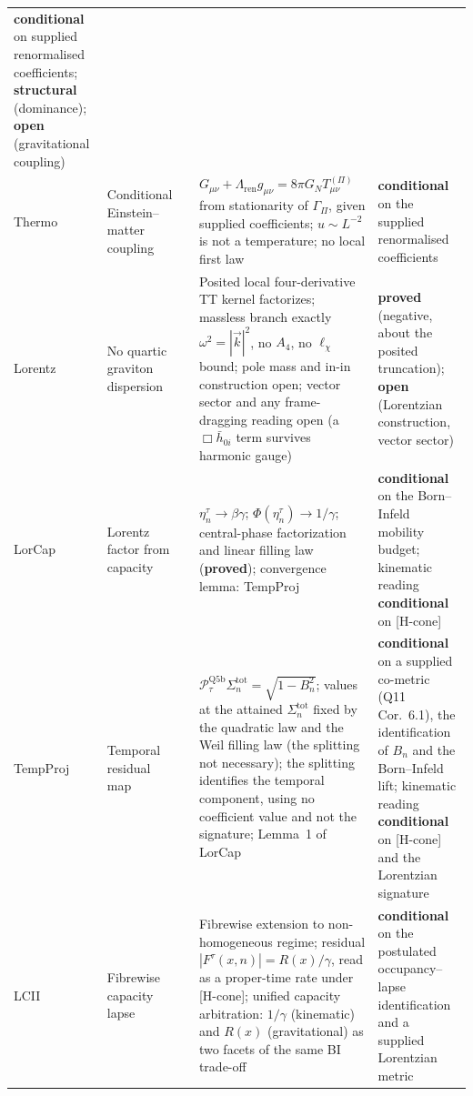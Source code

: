 \documentclass[11pt,a4paper]{article}
\newcommand{\sproved}{\textcolor{cproved}{\textbf{proved}}}
\newcommand{\sstruct}{\textcolor{cstruct}{\textbf{structural}}}
\newcommand{\sopen}{\textcolor{copen}{\textbf{open}}}
\newcommand{\scond}{\textcolor{ccond}{\textbf{conditional}}}
\begin{document}
\begin{longtable}{@{}p{1.70cm}p{2.9cm}p{1.3cm}p{6.25cm}>{\raggedright\arraybackslash}p{2.0cm}@{}}
      \scond{} on supplied renormalised coefficients; \sstruct{} (dominance); \sopen{} (gravitational coupling) \\[3pt]
      Thermo & Conditional Einstein--matter coupling & \cite{Beau2026Thermodynamics} &
      $G_{\mu\nu} + \Lambda_{\mathrm{ren}}g_{\mu\nu} = 8\pi G_N T^{(\Pi)}_{\mu\nu}$ from stationarity of
      $\Gamma_\Pi$, given supplied coefficients; $u \sim L^{-2}$ is not a temperature; no local first law &
      \scond{} on the supplied renormalised coefficients \\[3pt]
      Lorentz & No quartic graviton dispersion & \cite{Beau2026i} &
      Posited local four-derivative TT kernel factorizes; massless branch exactly $\omega^2=|\vec k|^2$, no $A_4$,
      no $\ell_\chi$ bound; pole mass and in-in construction open;
      vector sector and any frame-dragging reading open (a $\Box\bar h_{0i}$ term survives harmonic gauge) &
      \sproved{} (negative, about the posited truncation); \sopen{} (Lorentzian construction, vector sector) \\[3pt]
      LorCap & Lorentz factor from capacity & \cite{Beau2026n} &
      $\eta_n^\tau \to \beta\gamma$; $\Phi(\eta_n^\tau) \to 1/\gamma$;
      central-phase factorization and linear filling law (\sproved);
      convergence lemma: TempProj~\cite{Beau2026tp} &
      \scond{} on the Born--Infeld mobility budget; kinematic reading \scond{} on [H-cone] \\[3pt]
      TempProj & Temporal residual map & \cite{Beau2026tp} &
      $\mathcal{P}_\tau^{\mathrm{Q5b}}\Sigma_n^{\mathrm{tot}} = \sqrt{1-B_n^2}$; values at the attained
      $\Sigma_n^{\mathrm{tot}}$ fixed by the quadratic law and the Weil filling law (the splitting not necessary);
      the splitting identifies the temporal component, using no coefficient value and not the signature;
      Lemma~1 of LorCap &
      \scond{} on a supplied co-metric (Q11 Cor.~6.1), the identification of $B_n$ and the Born--Infeld lift;
      kinematic reading \scond{} on [H-cone] and the Lorentzian signature \\[3pt]
      LCII & Fibrewise capacity lapse & \cite{Beau2026lco2} &
      Fibrewise extension to non-homogeneous regime; residual $|F^\tau(x,n)| = R(x)/\gamma$, read as a proper-time
      rate under [H-cone];
      unified capacity arbitration: $1/\gamma$ (kinematic) and $R(x)$ (gravitational)
      as two facets of the same BI trade-off &
      \scond{} on the postulated occupancy--lapse identification and a supplied Lorentzian metric \\[3pt]

\end{longtable}
\end{document}
